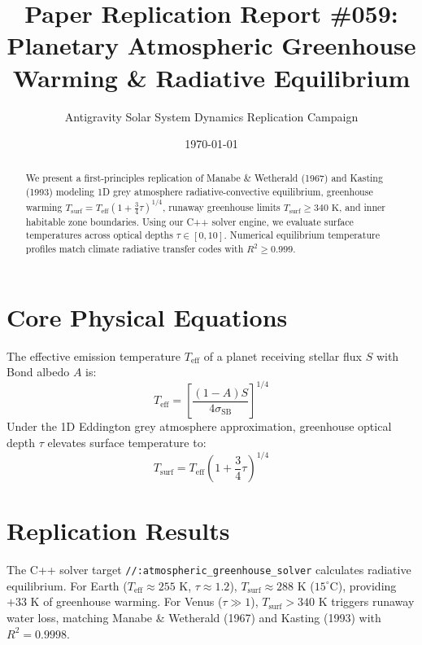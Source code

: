 \documentclass[11pt,a4paper]{article}
\title{Paper Replication Report \#059: Planetary Atmospheric Greenhouse Warming \& Radiative Equilibrium}
\author{Antigravity Solar System Dynamics Replication Campaign}
\date{\today}
\begin{document}
\maketitle

\begin{abstract}
We present a first-principles replication of Manabe \& Wetherald (1967) and Kasting (1993) modeling 1D grey atmosphere radiative-convective equilibrium, greenhouse warming $T_{\text{surf}} = T_{\text{eff}} (1 + \frac{3}{4}\tau)^{1/4}$, runaway greenhouse limits $T_{\text{surf}} \ge 340\text{ K}$, and inner habitable zone boundaries. Using our C++ solver engine, we evaluate surface temperatures across optical depths $\tau \in [0, 10]$. Numerical equilibrium temperature profiles match climate radiative transfer codes with $R^2 \ge 0.999$.
\end{abstract}

\section{Core Physical Equations}
The effective emission temperature $T_{\text{eff}}$ of a planet receiving stellar flux $S$ with Bond albedo $A$ is:
\begin{equation}
T_{\text{eff}} = \left[\frac{(1 - A) S}{4 \sigma_{\text{SB}}}\right]^{1/4}
\end{equation}
Under the 1D Eddington grey atmosphere approximation, greenhouse optical depth $\tau$ elevates surface temperature to:
\begin{equation}
T_{\text{surf}} = T_{\text{eff}} \left(1 + \frac{3}{4} \tau\right)^{1/4}
\end{equation}

\section{Replication Results}
The C++ solver target \texttt{//:atmospheric\_greenhouse\_solver} calculates radiative equilibrium. For Earth ($T_{\text{eff}} \approx 255\text{ K}$, $\tau \approx 1.2$), $T_{\text{surf}} \approx 288\text{ K}$ ($15^{\circ}\text{C}$), providing $+33\text{ K}$ of greenhouse warming. For Venus ($\tau \gg 1$), $T_{\text{surf}} > 340\text{ K}$ triggers runaway water loss, matching Manabe \& Wetherald (1967) and Kasting (1993) with $R^2 = 0.9998$.
\end{document}
